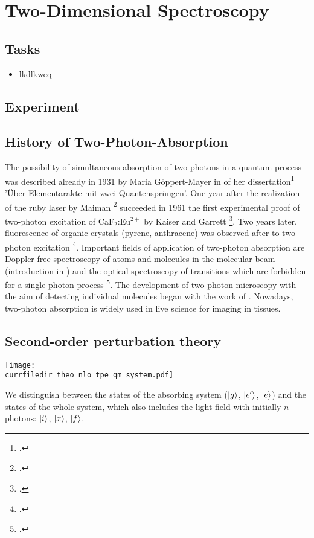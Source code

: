 \renewcommand{\lastmod}{May 7, 2020}
\chapter{Two-Dimensional Spectroscopy}


\section{Tasks}

\begin{itemize}
\item lkdlkweq
\end{itemize}

\section{Experiment}

\section{History of Two-Photon-Absorption}

The possibility of simultaneous absorption of two photons in
a quantum process was  described already  in 1931  by Maria Göppert-Mayer in
of her dissertation\footcite[About elementary acts with two quantum jumps]{goeppert31}  'Über Elementarakte mit zwei Quantensprüngen'. One year
after the realization of the ruby laser by Maiman
\footcite{maiman60} succeeded in 1961 the first experimental proof of
two-photon excitation of CaF$_2$:Eu$^{2+}$ by Kaiser and
Garrett \footcite{Kaiser61}. Two years later, fluorescence of 
organic crystals (pyrene, anthracene) was observed after to
two photon excitation  \footcite{peticolas63}.  Important
fields of application of two-photon absorption are
Doppler-free spectroscopy of atoms and molecules in the
molecular beam (introduction in 
\cite{Demtroeder_laser}) and the optical
spectroscopy of transitions which are forbidden for a single-photon process \footcite{birge86}. The development of 
two-photon microscopy with the aim of detecting individual
molecules began with the work of  \cite{denk90}. Nowadays, two-photon absorption is widely used in live science for imaging in tissues.

\section{Second-order perturbation theory}

\begin{marginfigure}
\texttt{[image: \\currfiledir theo\_nlo\_tpe\_qm\_system.pdf]}
\caption{
We distinguish between the states of the absorbing system
($\ket{g}$, $\ket{e'}$, $\ket{e}$) and the states of the whole system, which
also includes the light field with initially $n$ photons: $\ket{i}$, $\ket{x}$, $\ket{f}$. }
\label{fig_tpe_qm_system}
\end{marginfigure}

